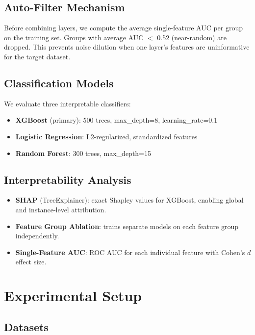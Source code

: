 \documentclass[sigconf,nonacm]{acmart}
\begin{document}
\subsection{Auto-Filter Mechanism}

Before combining layers, we compute the average single-feature AUC per group on the training set. Groups with average AUC $<$ 0.52 (near-random) are dropped. This prevents noise dilution when one layer's features are uninformative for the target dataset.

\subsection{Classification Models}

We evaluate three interpretable classifiers:
\begin{itemize}
    \item \textbf{XGBoost} (primary): 500 trees, max\_depth=8, learning\_rate=0.1
    \item \textbf{Logistic Regression}: L2-regularized, standardized features
    \item \textbf{Random Forest}: 300 trees, max\_depth=15
\end{itemize}

\subsection{Interpretability Analysis}

\begin{itemize}
    \item \textbf{SHAP} (TreeExplainer): exact Shapley values for XGBoost, enabling global and instance-level attribution.
    \item \textbf{Feature Group Ablation}: trains separate models on each feature group independently.
    \item \textbf{Single-Feature AUC}: ROC AUC for each individual feature with Cohen's $d$ effect size.
\end{itemize}

\section{Experimental Setup}

\subsection{Datasets}
\end{document}
